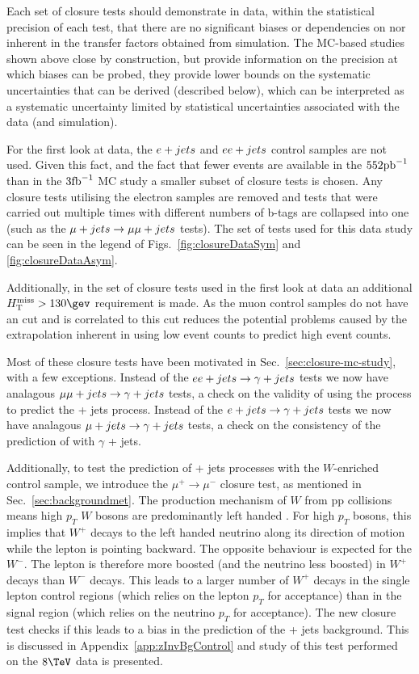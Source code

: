 Each set of closure tests should demonstrate in data, within the
statistical precision of each test, that there are no significant
biases or dependencies on \njet nor \scalht inherent in the transfer
factors obtained from simulation. The MC-based studies shown above
close by construction, but provide information on the precision at
which biases can be probed, \ie they provide lower bounds on the
systematic uncertainties that can be derived (described below), which
can be interpreted as a systematic uncertainty limited by statistical
uncertainties associated with the data (and simulation).

For the first look at data, the $\ej$ and $\eej$ control samples are
not used. Given this fact, and the fact that fewer events are
available in the $552\ipb$ than in the $3\ifb$ MC study a smaller
subset of closure tests is chosen. Any closure tests utilising the
electron samples are removed and tests that were carried out
multiple times with different numbers of b-tags are collapsed into one
(such as the $\mj\rightarrow\mmj$ tests). The set of tests used for
this data study can be seen in the legend of
Figs.~\ref{fig:closureDataSym} and \ref{fig:closureDataAsym}. 

Additionally, in the set of closure tests used in the first look at
data an additional $\mht>130\gev$ requirement is made. As the muon
control samples do not have an \alphat cut and \mht is correlated to
\alphat this cut reduces the potential problems
caused by the extrapolation inherent in using low \mht event counts to
predict high \mht event counts.

Most of these closure tests have been motivated in
Sec.~\ref{sec:closure-mc-study}, with a few exceptions. Instead of the
$\eej\rightarrow\gj$ tests we now have analagous
$\mmj\rightarrow\gj$ tests, a check on the validity of using the \gj
process to predict the \znunu + jets process. Instead of the 
$\ej\rightarrow\gj$ tests we now have analagous
$\mj\rightarrow\gj$ tests, a check on 
the consistency of the prediction of \wej with $\gamma$ + jets.

Additionally, to test the prediction of \znunu + jets processes with
the $W$-enriched \mj control sample, we introduce the
$\mu^{+}\rightarrow\mu^{-}$ closure test, as mentioned in
Sec.~\ref{sec:backgroundmet}. The production mechanism of $W$ from pp collisions means
high $p_T$ $W$ bosons are predominantly left handed \cite{WPol}.  
For high $p_T$ bosons, this implies that $W^+$ decays 
to the left handed neutrino along its direction of motion while 
the lepton is pointing backward. The opposite behaviour is
expected for the $W^-$. The lepton is therefore more boosted (and
the neutrino less boosted) in $W^+$ decays than $W^-$ decays.  This
leads to a larger number of $W^+$ decays in the single lepton control
regions (which relies on the lepton $p_T$ for acceptance) than in the
signal region (which relies on the neutrino $p_T$ for acceptance). The
new closure test checks if this leads to a bias in the prediction of the 
\znunu + jets background. This is discussed in
Appendix~\ref{app:zInvBgControl} and study of this test performed on the
$8\tev$ data is presented.

